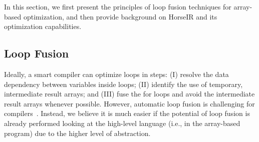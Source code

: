 
In this section, we first present the principles of loop fusion techniques for
array-based optimization, and then provide background on HorseIR and its
optimization capabilities. 

\subsection{Loop Fusion}


Ideally, a smart compiler can optimize loops in steps:
(I) resolve the data dependency between variables inside loops;
(II) identify the use of temporary, intermediate result arrays; and
(III) fuse the for loops and avoid the intermediate result arrays whenever possible.
However, automatic loop fusion is challenging for
compilers~\cite{Kennedy01:FastFusion,Kennedy1993:LoopFusion}.
Instead, we believe it is much easier if the potential of loop fusion is
already performed looking at the high-level language
(i.e., in the array-based program) due to the higher level of abstraction.

